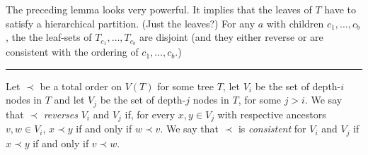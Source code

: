\documentclass[kpfonts]{patmorin}
\begin{document}
The preceding lemma looks very powerful.  It implies that the leaves of $T$ have to satisfy a hierarchical partition. (Just the leaves?)  For any $a$ with children $c_1,\ldots,c_b$, the the leaf-sets of $T_{c_1},\ldots,T_{c_b}$ are disjoint (and they either reverse or are consistent with the ordering of $c_1,\ldots,c_b$.) 


% 
% 
% 
% 
% 
% 
% 
% 
% 
% 
% 
% 
% 
% 

\hrule

Let $\prec$ be a total order on $V(T)$ for some tree $T$, let $V_i$ be the set of depth-$i$ nodes in $T$ and let $V_j$ be the set of depth-$j$ nodes in $T$, for some $j>i$.  We say that $\prec$ \emph{reverses} $V_i$ and $V_j$ if, for every $x,y\in V_j$ with respective ancestors $v,w\in V_i$, $x\prec y$ if and only if $w\prec v$.  We say that $\prec$ is \emph{consistent} for $V_i$ and $V_j$ if $x\prec y$ if and only if $v\prec w$.  
\end{document}
